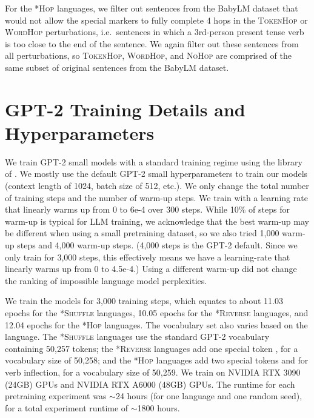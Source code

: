 \documentclass[11pt]{article}
\newcommand{\singularmarker}{%
  \setlength{\fboxsep}{1pt}%
  \fbox{\texttt{S}}%
}
\newcommand{\pluralmarker}{%
  \setlength{\fboxsep}{1pt}%
  \fbox{\texttt{P}}%
}
\newcommand{\revmarker}{%
  \setlength{\fboxsep}{1pt}%
  \fbox{\texttt{R}}%
}
\begin{document}
For the \textsc{*Hop} languages, we filter out sentences from the BabyLM dataset that would not allow the special markers to fully complete 4 hops in the \textsc{TokenHop} or \textsc{WordHop} perturbations, i.e.\ sentences in which a 3rd-person present tense verb is too close to the end of the sentence. We again filter out these sentences from all perturbations, so \textsc{TokenHop}, \textsc{WordHop}, and \textsc{NoHop} are comprised of the same subset of original sentences from the BabyLM dataset.

\section{GPT-2 Training Details and Hyperparameters} \label{sec:appendix-hyperparameters}

We train GPT-2 small models with a standard training regime \cite{radford2018improving, radford2019languagemodels} using the library of  \citet{Mistral}. We mostly use the default GPT-2 small hyperparameters to train our models (context length of 1024, batch size of 512, etc.). We only change the total number of training steps and the number of warm-up steps. We train with a learning rate that linearly warms up from 0 to 6e-4 over 300 steps. While 10\% of steps for warm-up is typical for LLM training, we acknowledge that the best warm-up may be different when using a small pretraining dataset, so we also tried 1,000 warm-up steps and 4,000 warm-up steps. (4,000 steps is the GPT-2 default. Since we only train for 3,000 steps, this effectively means we have a learning-rate that linearly warms up from 0 to \mbox{4.5e-4}.) Using a different warm-up did not change the ranking of impossible language model perplexities.

We train the models for 3,000 training steps, which equates to about 11.03 epochs for the \textsc{*Shuffle} languages, 10.05 epochs for the \textsc{*Reverse} languages, and 12.04 epochs for the \textsc{*Hop} languages. The vocabulary set also varies based on the language. The \textsc{*Shuffle} languages use the standard GPT-2 vocabulary containing 50,257 tokens; the \textsc{*Reverse} languages add one special token \revmarker, for a  vocabulary size of 50,258; and the \textsc{*Hop} languages add two special tokens \singularmarker\space and \pluralmarker\space for verb inflection, for a vocabulary size of 50,259. We train on NVIDIA RTX 3090 (24GB) GPUs and NVIDIA RTX A6000 (48GB) GPUs. The runtime for each pretraining experiment was $\sim$24 hours (for one language and one random seed), for a total experiment runtime of $\sim$1800 hours.
\end{document}
